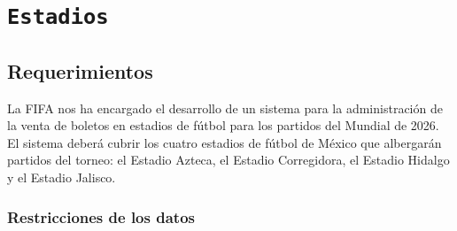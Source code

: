 \section{\texttt{Estadios}}

\subsection{Requerimientos}

La FIFA nos ha encargado el desarrollo de un sistema para la administración de la venta de boletos
en estadios de fútbol para los partidos del Mundial de 2026. El sistema deberá cubrir los cuatro
estadios de fútbol de México que albergarán partidos del torneo: el Estadio Azteca,
el Estadio Corregidora, el Estadio Hidalgo y el Estadio Jalisco.

\subsubsection*{Restricciones de los datos}

